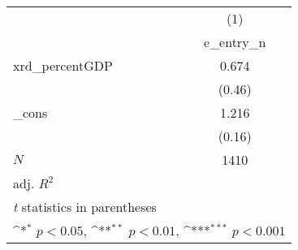 {
\def\sym#1{\ifmmode^{#1}\else\(^{#1}\)\fi}
\begin{tabular}{l*{1}{c}}
\toprule
            &\multicolumn{1}{c}{(1)}\\
            &\multicolumn{1}{c}{e\_entry\_n}\\
\midrule
xrd\_percentGDP&       0.674         \\
            &      (0.46)         \\
\addlinespace
\_cons      &       1.216         \\
            &      (0.16)         \\
\midrule
\(N\)       &        1410         \\
adj. \(R^{2}\)&                     \\
\bottomrule
\multicolumn{2}{l}{\footnotesize \textit{t} statistics in parentheses}\\
\multicolumn{2}{l}{\footnotesize \sym{*} \(p<0.05\), \sym{**} \(p<0.01\), \sym{***} \(p<0.001\)}\\
\end{tabular}
}
